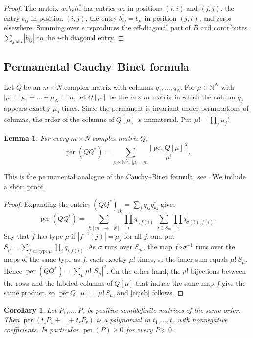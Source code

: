 \documentclass[11pt]{amsart}
\newtheorem{lemma}[theorem]{Lemma}
\newtheorem{corollary}[theorem]{Corollary}
\theoremstyle{remark}
\numberwithin{equation}{section}
\newcommand{\per}{\operatorname{per}}
\newcommand{\N}{\mathbb{N}}
\newcommand{\conj}[1]{\overline{#1}}
\begin{document}
\begin{proof}
The matrix $w_eh_eh_e^*$ has entries $w_e$ in positions $(i,i)$ and $(j,j)$, the entry $b_{ij}$ in position $(i,j)$, the entry $\conj{b_{ij}}=b_{ji}$ in position $(j,i)$, and zeros elsewhere. Summing over $e$ reproduces the off-diagonal part of $B$ and contributes $\sum_{j\ne i}|b_{ij}|$ to the $i$-th diagonal entry.
\end{proof}

\subsection{Permanental Cauchy--Binet formula}

Let $Q$ be an $m\times N$ complex matrix with columns $q_1,\dots,q_N$. For $\mu\in\N^N$ with $|\mu|=\mu_1+\dots+\mu_N=m$, let $Q[\mu]$ be the $m\times m$ matrix in which the column $q_j$ appears exactly $\mu_j$ times. Since the permanent is invariant under permutations of columns, the order of the columns of $Q[\mu]$ is immaterial. Put $\mu!=\prod_j\mu_j!$.

\begin{lemma}\label{lem:cb}
For every $m\times N$ complex matrix $Q$,
\begin{equation}\label{eq:cb}
\per(QQ^*)=\sum_{\mu\in\N^N,\ |\mu|=m}\frac{|\per Q[\mu]|^2}{\mu!}.
\end{equation}
\end{lemma}

This is the permanental analogue of the Cauchy--Binet formula; see \cite{Min}. We include a short proof.

\begin{proof}
Expanding the entries $(QQ^*)_{ik}=\sum_jq_{ij}\conj{q_{kj}}$ gives
\[
\per(QQ^*)=\sum_{f:[m]\to[N]}\ \prod_{i}q_{i,f(i)}\ \conj{\sum_{\sigma\in S_m}\prod_iq_{\sigma(i),f(i)}}.
\]
Say that $f$ has type $\mu$ if $|f^{-1}(j)|=\mu_j$ for all $j$, and put $S_\mu=\sum_{f\text{ of type }\mu}\prod_iq_{i,f(i)}$. As $\sigma$ runs over $S_m$, the map $f\circ\sigma^{-1}$ runs over the maps of the same type as $f$, each exactly $\mu!$ times, so the inner sum equals $\mu!\,S_\mu$. Hence $\per(QQ^*)=\sum_\mu\mu!\,|S_\mu|^2$. On the other hand, the $\mu!$ bijections between the rows and the labeled columns of $Q[\mu]$ that induce the same map $f$ give the same product, so $\per Q[\mu]=\mu!\,S_\mu$, and \eqref{eq:cb} follows.
\end{proof}

\begin{corollary}\label{cor:nonneg}
Let $P_1,\dots,P_r$ be positive semidefinite matrices of the same order. Then $\per(t_1P_1+\dots+t_rP_r)$ is a polynomial in $t_1,\dots,t_r$ with nonnegative coefficients. In particular $\per(P)\ge0$ for every $P\succeq0$.
\end{corollary}
\end{document}
